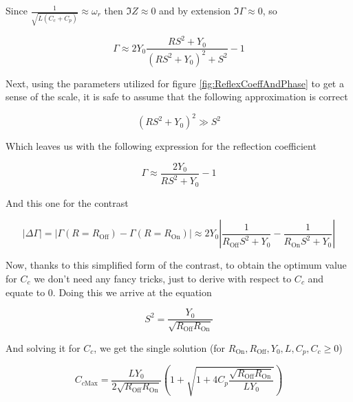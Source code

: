\documentclass[../main.tex]{subfiles}
\begin{document}
Since \(\frac{1}{\sqrt{L (C_{c} + C_{p})}} \approx \omega_{r}\) then
\(\Im Z \approx 0\) and by extension \(\Im \Gamma \approx 0\), so

\begin{equation}
    \Gamma \approx 2 Y_{0}\frac{RS^2 + Y_{0}}{(RS^2 + Y_{0})^2 + S^2} - 1
\end{equation}

Next, using the parameters utilized for figure \ref{fig:ReflexCoeffAndPhase}
to get a sense of the scale, it is safe to assume that the following
approximation is correct

\begin{equation}
\label{eq:ParallelContrAprox}
    (RS^2 + Y_{0})^2 \gg S^2
\end{equation}

Which leaves us with the following expression for the reflection coefficient

\begin{equation}
\label{eq:ApproxReflecCoeff}
    \Gamma \approx \frac{2Y_{0}}{RS^2 + Y_{0}} - 1
\end{equation}

And this one for the contrast

\begin{equation}
\label{eq:ParallelContr}
    |\Delta\Gamma| = |\Gamma(R=R_{\text{Off}}) - \Gamma(R=R_{\text{On}})|
                   \approx 2Y_{0}\left|\frac{1}{
                   R_{\text{Off}}S^2 + Y_{0}} - \frac{1}{R_{\text{On}}S^2 + Y_{0}
               }\right|
\end{equation}

Now, thanks to this simplified form of the contrast, to obtain the optimum
value for \(C_{c}\) we don't need any fancy tricks, just to derive with respect
to \(C_{c}\) and equate to \(0\). Doing this we arrive at the equation

\begin{equation}
\label{eq:ParallelContrOptS2NonRho}
    S^2 = \frac{Y_{0}}{\sqrt{R_{\text{Off}}R_{\text{On}}}}
\end{equation}

And solving it for \(C_{c}\), we get the single solution
(for \(R_{\text{On}}, R_{\text{Off}}, Y_{0}, L, C_{p}, C_{c} \geq 0\))

\begin{equation}
\label{eq:ParallelContrOptCcNonRho}
C_{c\text{Max}} = \frac{L Y_{0}}{2\sqrt{R_{\text{Off}}R_{\text{On}}}}
\left(1 + \sqrt{1 + 4C_{p}\frac{\sqrt{R_{\text{Off}}R_{\text{On}}}}{LY_{0}}}\right)
\end{equation}
\end{document}
